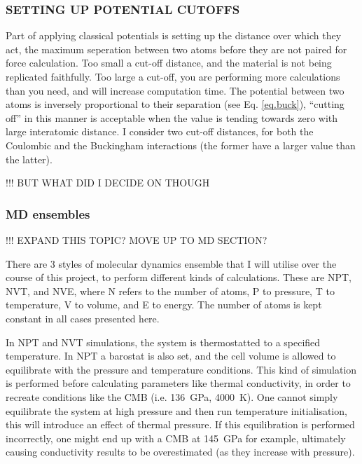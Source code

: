 \subsubsection{SETTING UP POTENTIAL CUTOFFS}

Part of applying classical potentials is setting up the distance over which they act, the maximum seperation between two atoms before they are not paired for force calculation. Too small a cut-off distance, and the material is not being replicated faithfully. Too large a cut-off, you are performing more calculations than you need, and will increase computation time. The potential between two atoms is inversely proportional to their separation (see Eq. \ref{eq.buck}), ``cutting off'' in this manner is acceptable when the value is tending towards zero with large interatomic distance. I consider two cut-off distances, for both the Coulombic and the Buckingham interactions (the former have a larger value than the latter).

 !!! BUT WHAT DID I DECIDE ON THOUGH 
 


\subsubsection{MD ensembles}

!!! EXPAND THIS TOPIC? MOVE UP TO MD SECTION?

There are 3 styles of molecular dynamics ensemble that I will utilise over the course of this project, to perform different kinds of calculations. These are NPT, NVT, and NVE, where N refers to the number of atoms, P to pressure, T to temperature, V to volume, and E to energy. The number of atoms is kept constant in all cases presented here. 

In NPT and NVT simulations, the system is thermostatted to a specified temperature. In NPT a barostat is also set, and the cell volume is allowed to equilibrate with the pressure and temperature conditions. This kind of simulation is performed before calculating parameters like thermal conductivity, in order to recreate conditions like the CMB (i.e. 136~GPa, 4000~K). One cannot simply equilibrate the system at high pressure and then run temperature initialisation, this will introduce an effect of thermal pressure. If this equilibration is performed incorrectly, one might end up with a CMB at 145~GPa for example, ultimately causing conductivity results to be overestimated (as they increase with pressure).


